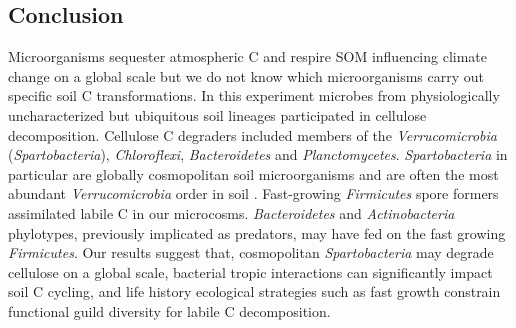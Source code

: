 \subsection{Conclusion} 
Microorganisms sequester atmospheric C and respire SOM influencing climate
change on a global scale but we do not know which microorganisms carry out
specific soil C transformations. In this experiment microbes from
physiologically uncharacterized but ubiquitous soil lineages participated in
cellulose decomposition. Cellulose C degraders included members of the
\textit{Verrucomicrobia} (\textit{Spartobacteria}), \textit{Chloroflexi},
\textit{Bacteroidetes} and \textit{Planctomycetes}. \textit{Spartobacteria} in
particular are globally cosmopolitan soil microorganisms and are often the most
abundant \textit{Verrucomicrobia} order in soil \citep{Bergmann_2011}.
Fast-growing \textit{Firmicutes} spore formers assimilated labile C in our
microcosms. \textit{Bacteroidetes} and \textit{Actinobacteria} phylotypes,
previously implicated as predators, may have fed on the fast growing
\textit{Firmicutes}. Our results suggest that, cosmopolitan
\textit{Spartobacteria} may degrade cellulose on a global scale, bacterial
tropic interactions can significantly impact soil C cycling, and life history
ecological strategies such as fast growth  constrain functional guild
diversity for labile C decomposition.
